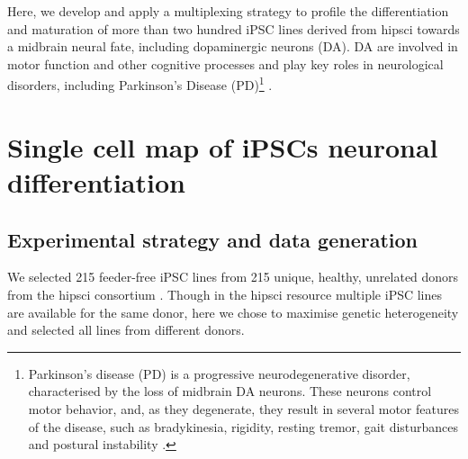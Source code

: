 Here, we develop and apply a multiplexing strategy to profile the differentiation and maturation of more than two hundred iPSC lines derived from \gls{hipsci} towards a midbrain neural fate, including dopaminergic neurons (DA). 
DA are involved in motor function and other cognitive processes and play key roles in neurological disorders, including Parkinson’s Disease (PD)\footnote{Parkinson’s disease (PD) is a progressive neurodegenerative disorder, characterised by the loss of midbrain DA neurons. 
These neurons control motor behavior, and, as they degenerate, they result in several motor features of the disease, such as bradykinesia, rigidity, resting tremor, gait disturbances and postural instability \cite{lees2009parkinsons}.} \cite{osborn2017seq, stoddard2020stem}. 




\newpage

\section{Single cell map of iPSCs neuronal differentiation}

\subsection{Experimental strategy and data generation}

We selected 215 feeder-free iPSC lines from 215 unique, healthy, unrelated donors from the \gls{hipsci} consortium \cite{kilpinen2017common}.
Though in the \gls{hipsci} resource multiple iPSC lines are available for the same donor, here we chose to maximise genetic heterogeneity and selected all lines from different donors.\\

